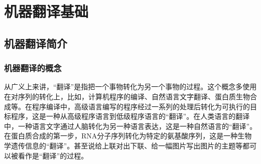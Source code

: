 
%


\part{机器翻译基础}
\renewcommand\figurename{图}%
\renewcommand\tablename{表}%


\chapter{机器翻译简介}


\section{机器翻译的概念}

\parinterval 从广义上来讲，``翻译''是指把一个事物转化为另一个事物的过程。这个概念多使用在对序列的转化上，比如，计算机程序的编译、自然语言文字翻译、蛋白质生物合成等。在程序编译中，高级语言编写的程序经过一系列的处理后转化为可执行的目标程序，这是一种从高级程序语言到低级程序语言的``翻译''。在人类语言的翻译中，一种语言文字通过人脑转化为另一种语言表达，这是一种自然语言的``翻译''。在蛋白质合成的第一步，RNA分子序列转化为特定的氨基酸序列，这是一种生物学遗传信息的``翻译''。甚至说给上联对出下联、给一幅图片写出图片的主题等都可以被看作是``翻译''的过程。
\vspace{0.5em}

